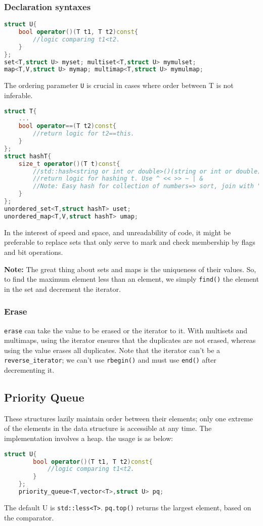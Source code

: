 \documentclass{article}
\begin{document}
\subsubsection*{Declaration syntaxes}
\begin{lstlisting}[caption={Sets and Maps},language=C++]
struct U{
    bool operator()(T t1, T t2)const{
        //logic comparing t1<t2.
    }
};
set<T,struct U> myset; multiset<T,struct U> mymulset;
map<T,V,struct U> mymap; multimap<T,struct U> mymulmap;
\end{lstlisting}
The ordering parameter \texttt{U} is crucial in cases where order between T is not inferable.
\begin{lstlisting}[caption={Unordered sets and maps},language=C++]
struct T{
    ...
    bool operator==(T t2)const{
        //return logic for t2==this.
    }
};
struct hashT{
    size_t operator()(T t)const{
        //std::hash<string or int or double>()(string or int or double)
        //return logic for hashing t. Use ^ << >> ~ | &
        //Note: Easy hash for collection of numbers=> sort, join with ","
    }
};
unordered_set<T,struct hashT> uset;
unordered_map<T,V,struct hashT> umap;
\end{lstlisting}
In the interest of speed and space, and unreadability of code, it might be
preferable to replace sets that only serve to mark and check membership
by flags and bit operations.\\
\begin{center}
\end{center}
\textbf{Note:} The great thing about sets and maps is the uniqueness of their values.
So, to find the maximum element less than an element, we simply \texttt{find()} the element
in the set and decrement the iterator.
\subsubsection{Erase}
\texttt{erase} can take the value to be erased or the iterator to it. With multisets
and multimaps, using the iterator ensures that the duplicates are not erased,
whereas using the value erases all duplicates. Note that the iterator can't be a
\texttt{reverse\_iterator}; we can't use \texttt{rbegin()} and must use
\texttt{end()} after decrementing it. 
\subsection{Priority Queue}
These structures lazily maintain order between their elements; only 
one extreme of the elements in the data structure is accessible at 
any time. The implementation involves a heap. the usage is as below:
\begin{lstlisting}[caption={Priority Queue},language=C++]
    struct U{
        bool operator()(T t1, T t2)const{
            //logic comparing t1<t2.
        }
    };
    priority_queue<T,vector<T>,struct U> pq;
\end{lstlisting}
The default U is \texttt{std::less<T>}. \texttt{pq.top()} returns
the largest element, based on the comparator.
\end{document}
